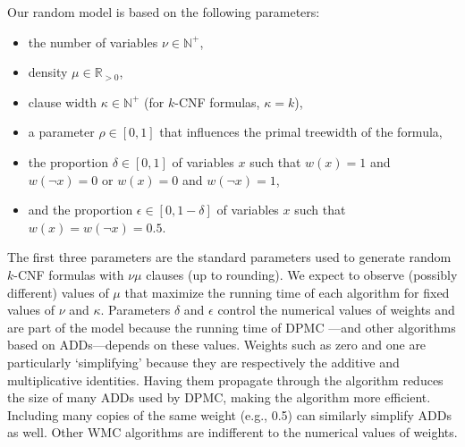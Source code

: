 Our random model is based on the following parameters:
\begin{itemize}
\item the number of variables $\nu \in \mathbb{N}^+$,
\item density $\mu \in \mathbb{R}_{>0}$,
\item clause width $\kappa \in \mathbb{N}^+$ (for $k$-CNF formulas, $\kappa =
  k$),
\item a parameter $\rho \in [0, 1]$ that influences the primal treewidth of
  the formula,
\item the proportion $\delta \in [0, 1]$ of variables $x$ such that $w(x) = 1$
  and $w(\neg x) = 0$ or $w(x) = 0$ and $w(\neg x) = 1$,
\item and the proportion $\epsilon \in [0, 1-\delta]$ of variables $x$ such that
  $w(x) = w(\neg x) = 0.5$.
\end{itemize}
The first three parameters are the standard parameters used to generate random
$k$-CNF formulas with $\nu\mu$ clauses (up to rounding). We expect to observe
(possibly different) values of $\mu$ that maximize the running time of each
algorithm for fixed values of $\nu$ and $\kappa$. Parameters $\delta$ and
$\epsilon$ control the numerical values of weights and are part of the model
because the running time of \textsc{DPMC} \citep{DBLP:conf/cp/DudekPV20}---and
other algorithms based on ADDs---depends on these values. Weights such as zero
and one are particularly `simplifying' because they are respectively the
additive and multiplicative identities. Having them propagate through the
algorithm reduces the size of many ADDs used by \textsc{DPMC}, making the
algorithm more efficient. Including many copies of the same weight (e.g., 0.5)
can similarly simplify ADDs as well. Other WMC algorithms are indifferent to the
numerical values of weights.

